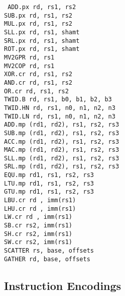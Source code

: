 {\tt
ADD.px  rd, rs1, rs2            \\
SUB.px  rd, rs1, rs2            \\
MUL.px  rd, rs1, rs2            \\
SLL.px  rd, rs1, shamt          \\
SRL.px  rd, rs1, shamt          \\
ROT.px  rd, rs1, shamt          \\
MV2GPR  rd, rs1                 \\
MV2COP  rd, rs1                 \\
XOR.cr  rd, rs1, rs2            \\
AND.cr  rd, rs1, rs2            \\
OR.cr   rd, rs1, rs2            \\
TWID.B  rd, rs1, b0, b1, b2, b3 \\
TWID.HN rd, rs1, n0, n1, n2, n3 \\
TWID.LN rd, rs1, n0, n1, n2, n3 \\
ADD.mp  (rd1, rd2),  rs1, rs2, rs3 \\
SUB.mp  (rd1, rd2),  rs1, rs2, rs3 \\
ACC.mp  (rd1, rd2),  rs1, rs2, rs3 \\
MAC.mp  (rd1, rd2),  rs1, rs2, rs3 \\
SLL.mp  (rd1, rd2),  rs1, rs2, rs3 \\
SRL.mp  (rd1, rd2),  rs1, rs2, rs3 \\
EQU.mp  rd1,         rs1, rs2, rs3 \\
LTU.mp  rd1,         rs1, rs2, rs3 \\
GTU.mp  rd1,         rs1, rs2, rs3 \\
LBU.cr  rd , imm(rs1)           \\
LHU.cr  rd , imm(rs1)           \\
LW.cr   rd , imm(rs1)           \\
SB.cr   rs2, imm(rs1)           \\
SH.cr   rs2, imm(rs1)           \\
SW.cr   rs2, imm(rs1)           \\
SCATTER rs, base, offsets       \\
GATHER  rd, base, offsets       \\
}

\newpage
\subsection{Instruction Encodings}

